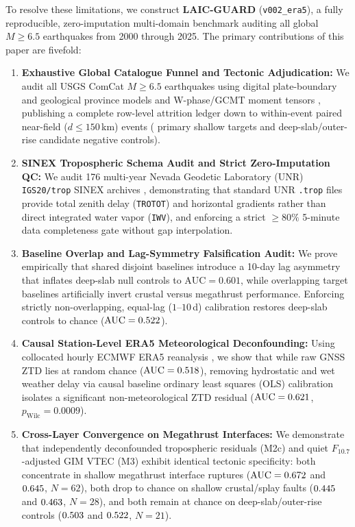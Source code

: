﻿\documentclass[journal]{IEEEtran}
\begin{document}
To resolve these limitations, we construct \textbf{LAIC-GUARD} (\texttt{v002\_era5}), a fully reproducible, zero-imputation multi-domain benchmark auditing all \LgTotalGlobalEvents{} global $M \ge 6.5$ earthquakes from 2000 through 2025. The primary contributions of this paper are fivefold:
\begin{enumerate}
    \item \textbf{Exhaustive Global Catalogue Funnel and Tectonic Adjudication:} We audit all \LgTotalGlobalEvents{} USGS ComCat $M \ge 6.5$ earthquakes using digital plate-boundary and geological province models \cite{bird2003,hasterok2022} and W-phase/GCMT moment tensors \cite{ekstrom2012}, publishing a complete row-level attrition ledger down to \LgPairedTierOneTotal{} within-event paired near-field ($d \le 150$\,km) events (\LgPairedShallowMain{} primary shallow targets and \LgPairedNullCtrlMain{} deep-slab/outer-rise candidate negative controls).
    \item \textbf{SINEX Tropospheric Schema Audit and Strict Zero-Imputation QC:} We audit 176 multi-year Nevada Geodetic Laboratory (UNR) \texttt{IGS20/trop} SINEX archives \cite{blewitt2018}, demonstrating that standard UNR \texttt{.trop} files provide total zenith delay (\texttt{TROTOT}) and horizontal gradients rather than direct integrated water vapor (\texttt{IWV}), and enforcing a strict $\ge 80\%$ 5-minute data completeness gate without gap interpolation.
    \item \textbf{Baseline Overlap and Lag-Symmetry Falsification Audit:} We prove empirically that shared disjoint baselines introduce a 10-day lag asymmetry that inflates deep-slab null controls to $\text{AUC} = 0.601$, while overlapping target baselines artificially invert crustal versus megathrust performance. Enforcing strictly non-overlapping, equal-lag ($1\text{--}10$\,d) calibration restores deep-slab controls to chance ($\text{AUC} = 0.522$).
    \item \textbf{Causal Station-Level ERA5 Meteorological Deconfounding:} Using collocated hourly ECMWF ERA5 reanalysis \cite{hersbach2020}, we show that while raw GNSS ZTD lies at random chance ($\text{AUC} = 0.518$), removing hydrostatic and wet weather delay via causal baseline ordinary least squares (OLS) calibration isolates a significant non-meteorological ZTD residual ($\text{AUC} = 0.621$, $p_{\text{Wilc}} = 0.0009$).
    \item \textbf{Cross-Layer Convergence on Megathrust Interfaces:} We demonstrate that independently deconfounded tropospheric residuals (M2c) and quiet $F_{10.7}$-adjusted GIM VTEC (M3) exhibit identical tectonic specificity: both concentrate in shallow megathrust interface ruptures ($\text{AUC} = 0.672$ and $0.645$, $N=62$), both drop to chance on shallow crustal/splay faults ($0.445$ and $0.463$, $N=28$), and both remain at chance on deep-slab/outer-rise controls ($0.503$ and $0.522$, $N=21$).
\end{enumerate}
\end{document}

